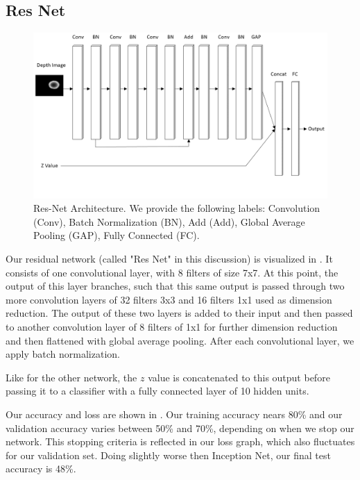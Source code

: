 \subsection{Res Net}

\begin{figure}[t!]
    \includegraphics[width=0.99\columnwidth]{figs/res_net.png}
\caption{Res-Net Architecture. We provide the following labels: Convolution (Conv), Batch Normalization (BN), Add (Add), Global Average Pooling (GAP), Fully Connected (FC).} \label{fig:res_net}
\end{figure}

Our residual network (called "Res Net" in this discussion) is visualized in . 
It consists of one convolutional layer, with 8 filters of size 7x7.
At this point, the output of this layer branches, such that this same output is passed through two more convolution layers of 32 filters 3x3 and 16 filters 1x1 used as dimension reduction. 
The output of these two layers is added to their input and then passed to another convolution layer of 8 filters of 1x1 for further dimension reduction and then flattened with global average pooling. 
After each convolutional layer, we apply batch normalization. 

Like for the other network, the $z$ value is concatenated to this output before passing it to a classifier with a fully connected layer of 10 hidden units.

Our accuracy and loss are shown in . 
Our training accuracy nears 80\% and our validation accuracy varies between 50\% and 70\%, depending on when we stop our network. 
This stopping criteria is reflected in our loss graph, which also fluctuates for our validation set. 
Doing slightly worse then Inception Net, our final test accuracy is 48\%. 


